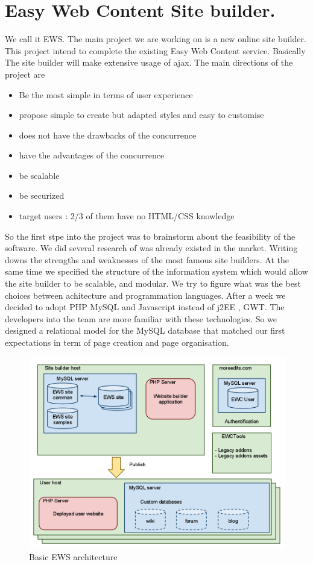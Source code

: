 \section{Easy Web Content Site builder.}

We call it EWS. The main project we are working on is a new online site builder. This project intend to complete the existing Easy Web Content service.
Basically The site builder will make extensive usage of ajax. The main directions of the project are
\begin{itemize}
\item Be the most simple in terms of user experience
\item propose simple to create but adapted styles and easy to customise
\item does not have the drawbacks of the concurrence
\item have the advantages of the concurrence
\item be scalable
\item be securized
\item target users : 2/3 of them have no HTML/CSS knowledge
\end{itemize}


So the first stpe into the project was to brainstorm about the feasibility of the software. We did several research of was already existed in the market. Writing downs the strengths and weaknesses of the most famous site builders. At the same time we specified the structure of the information system which would allow the site builder to be scalable, and modular. We try to figure what was the best choices between achitecture and programmation languages. After a week we decided to adopt PHP MySQL and Javascript instead of j2EE , GWT. The developers into the team are more familiar with these technologies. So we designed a relational model for the MySQL database that matched our first expectations in term of page creation and page organisation.

\begin{figure}[!ht]
\centering
\includegraphics[width=.55\textwidth]{img/ews_archi_before.png}
\caption{Basic EWS architecture }
\label{figure:ews_archi_after}
\end{figure}



